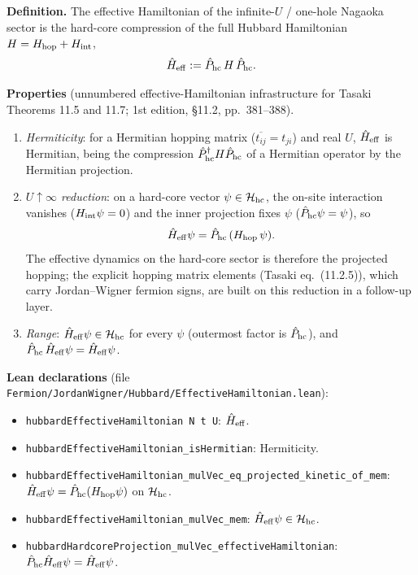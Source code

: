 \documentclass[a4paper,11pt]{article}
\begin{document}
\noindent\textbf{Definition.}
The effective Hamiltonian of the infinite-\(U\) / one-hole Nagaoka sector is
the hard-core compression of the full Hubbard Hamiltonian
\(H = H_{\rm hop} + H_{\rm int}\),
\[
  \hat H_{\rm eff} := \hat P_{\rm hc}\,H\,\hat P_{\rm hc}.
\]

\medskip
\noindent\textbf{Properties} (unnumbered effective-Hamiltonian
infrastructure for Tasaki Theorems 11.5 and 11.7; 1st edition, §11.2,
pp.~381--388).
\begin{enumerate}
  \item \emph{Hermiticity}: for a Hermitian hopping matrix
    (\(\overline{t_{ij}} = t_{ji}\)) and real \(U\), \(\hat H_{\rm eff}\) is
    Hermitian, being the compression \(\hat P_{\rm hc}^\dagger H
    \hat P_{\rm hc}\) of a Hermitian operator by the Hermitian projection.
  \item \emph{\(U\uparrow\infty\) reduction}: on a hard-core vector
    \(\psi\in\mathcal H_{\rm hc}\), the on-site interaction vanishes
    (\(H_{\rm int}\psi = 0\)) and the inner projection fixes \(\psi\)
    (\(\hat P_{\rm hc}\psi = \psi\)), so
    \[
      \hat H_{\rm eff}\psi = \hat P_{\rm hc}\,(H_{\rm hop}\,\psi).
    \]
    The effective dynamics on the hard-core sector is therefore the projected
    hopping; the explicit hopping matrix elements (Tasaki eq.~(11.2.5)),
    which carry Jordan--Wigner fermion signs, are built on this reduction in
    a follow-up layer.
  \item \emph{Range}: \(\hat H_{\rm eff}\psi\in\mathcal H_{\rm hc}\) for every
    \(\psi\) (outermost factor is \(\hat P_{\rm hc}\)), and
    \(\hat P_{\rm hc}\,\hat H_{\rm eff}\psi = \hat H_{\rm eff}\psi\).
\end{enumerate}

\medskip
\noindent\textbf{Lean declarations}
(file \texttt{Fermion/JordanWigner/Hubbard/EffectiveHamiltonian.lean}):
\begin{itemize}
  \item \texttt{hubbardEffectiveHamiltonian N t U}:
    \(\hat H_{\rm eff}\).
  \item \texttt{hubbardEffectiveHamiltonian\_isHermitian}: Hermiticity.
  \item \texttt{hubbardEffectiveHamiltonian\_mulVec\_eq\_projected\_kinetic\_of\_mem}:
    \(\hat H_{\rm eff}\psi = \hat P_{\rm hc}(H_{\rm hop}\psi)\) on
    \(\mathcal H_{\rm hc}\).
  \item \texttt{hubbardEffectiveHamiltonian\_mulVec\_mem}:
    \(\hat H_{\rm eff}\psi\in\mathcal H_{\rm hc}\).
  \item \texttt{hubbardHardcoreProjection\_mulVec\_effectiveHamiltonian}:
    \(\hat P_{\rm hc}\hat H_{\rm eff}\psi = \hat H_{\rm eff}\psi\).
\end{itemize}
\end{document}
